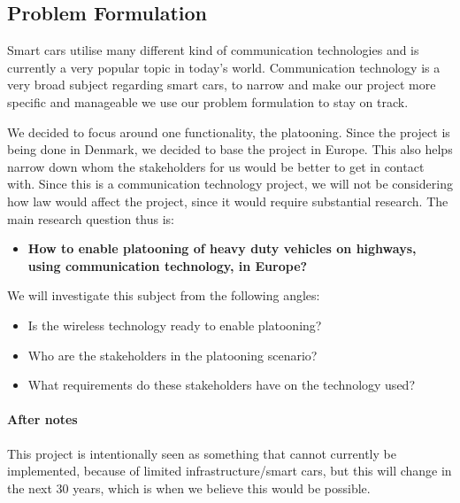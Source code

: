 \subsection{Problem Formulation}

Smart cars utilise many different kind of communication technologies and is currently a very popular topic in today's world. Communication technology is a very broad subject regarding smart cars, to narrow and make our project more specific and manageable we use our problem formulation to stay on track.\par
We decided to focus around one functionality, the platooning. Since the project is being done in Denmark, we decided to base the project in Europe. This also helps narrow down whom the stakeholders for us would be better to get in contact with.
Since this is a communication technology project, we will not be considering how law would affect the project, since it would require substantial research. The main research question thus is:
% 
\begin{itemize}
    \item \textbf{How to enable platooning of heavy duty vehicles on highways, using communication technology, in Europe?}
\end{itemize}
% 
We will investigate this subject from the following angles:
\begin{itemize}[nolistsep,noitemsep]
    \item Is the wireless technology ready to enable platooning?
    \item Who are the stakeholders in the platooning scenario?
    \item What requirements do these stakeholders have on the technology used?
\end{itemize}
% 
\paragraph{After notes}\par
This project is intentionally seen as something that cannot currently be implemented, because of limited infrastructure/smart cars, but this will change in the next 30 years, which is when we believe this would be possible.